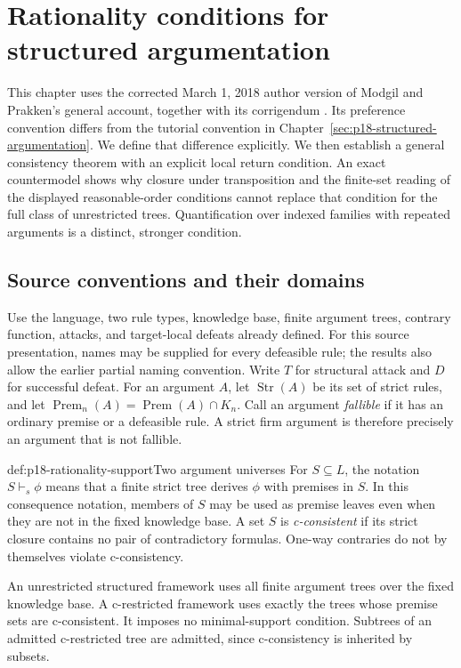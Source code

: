 \chapter{Rationality conditions for structured argumentation}
\label{sec:p18-structured-rationality}

This chapter uses the corrected March 1, 2018 author version of Modgil
and Prakken's general account, together with its corrigendum
\cite{ModgilPrakken2013GeneralCorrected,ModgilPrakken2018Corrigendum}.
Its preference convention differs from the tutorial convention in
Chapter~\ref{sec:p18-structured-argumentation}. We define that difference
explicitly. We then establish a general consistency theorem with an
explicit local return condition. An exact countermodel shows why closure
under transposition and the finite-set reading of the displayed
reasonable-order conditions cannot replace that condition for the full
class of unrestricted trees. Quantification over indexed families with
repeated arguments is a distinct, stronger condition.

\section{Source conventions and their domains}

Use the language, two rule types, knowledge base, finite argument trees,
contrary function, attacks, and target-local defeats already defined.
For this source presentation, names may be supplied for every defeasible
rule; the results also allow the earlier partial naming convention.
Write \(T\) for structural attack and \(D\) for successful defeat.
For an argument \(A\), let \(\operatorname{Str}(A)\) be its set of strict
rules, and let \(\operatorname{Prem}_n(A)=\operatorname{Prem}(A)\cap K_n\).
Call an argument \emph{fallible} if it has an ordinary premise or a
defeasible rule. A strict firm argument is therefore precisely an
argument that is not fallible.

\begin{hbdefinition}{def:p18-rationality-support}{Two argument universes}
For \(S\subseteq L\), the notation \(S\vdash_s\phi\) means that a finite
strict tree derives \(\phi\) with premises in \(S\). In this consequence
notation, members of \(S\) may be used as premise leaves even when they
are not in the fixed knowledge base.
A set \(S\) is \emph{c-consistent} if its strict closure contains no
pair of contradictory formulas. One-way contraries do not by themselves
violate c-consistency.

An unrestricted structured framework uses all finite argument trees over
the fixed knowledge base. A c-restricted framework uses exactly the trees
whose premise sets are c-consistent. It imposes no minimal-support
condition. Subtrees of an admitted c-restricted tree are admitted, since
c-consistency is inherited by subsets.
\end{hbdefinition}

